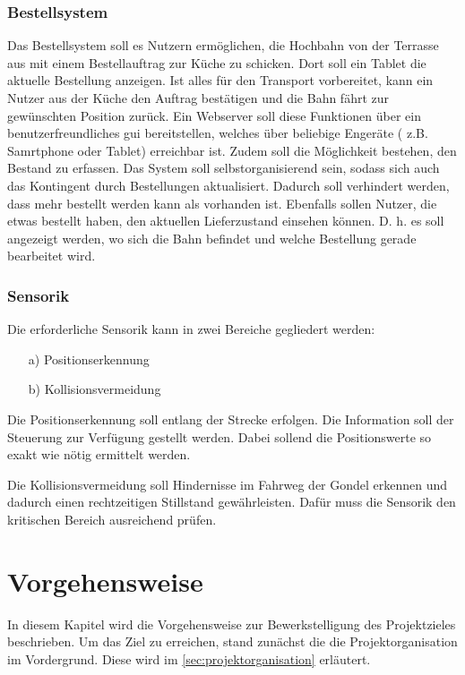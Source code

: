 \subsection{Bestellsystem}


Das Bestellsystem soll es Nutzern ermöglichen, die Hochbahn von der Terrasse aus mit einem Bestellauftrag zur Küche zu schicken. 
Dort soll ein Tablet die aktuelle Bestellung anzeigen. Ist alles für den Transport vorbereitet, kann ein Nutzer aus der Küche den Auftrag 
bestätigen und die Bahn fährt zur gewünschten Position zurück. Ein Webserver soll diese Funktionen über ein benutzerfreundliches \acrfull{gui} bereitstellen, welches über beliebige Engeräte ( z.B. Samrtphone oder Tablet) erreichbar ist.
Zudem soll die Möglichkeit bestehen, den Bestand zu erfassen. Das System soll selbstorganisierend sein, sodass sich auch das Kontingent durch Bestellungen aktualisiert. Dadurch soll verhindert werden, dass mehr bestellt werden kann als vorhanden ist.
Ebenfalls sollen Nutzer, die etwas bestellt haben, den aktuellen Lieferzustand einsehen können. D. h. es soll angezeigt werden, wo sich die Bahn befindet und welche Bestellung gerade bearbeitet wird.



\subsection{Sensorik}
Die erforderliche Sensorik kann in zwei Bereiche gegliedert werden: 

\begin{itemize}
	\item [a)] Positionserkennung 
	\item [b)] Kollisionsvermeidung  
	
\end{itemize}

Die Positionserkennung soll entlang der Strecke erfolgen. Die Information soll der Steuerung zur Verfügung gestellt werden. Dabei sollend die Positionswerte so exakt wie nötig ermittelt werden.

Die Kollisionsvermeidung soll Hindernisse im Fahrweg der Gondel erkennen und dadurch einen rechtzeitigen Stillstand gewährleisten. Dafür muss die Sensorik den kritischen Bereich ausreichend prüfen. 



\chapter{Vorgehensweise}
\label{sec:vorgehensweise}
In diesem Kapitel wird die Vorgehensweise zur Bewerkstelligung des Projektzieles beschrieben. Um das Ziel zu erreichen, stand zunächst die die Projektorganisation im Vordergrund. Diese wird im  \autoref{sec:projektorganisation} erläutert. 

